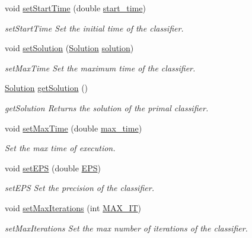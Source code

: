 \begin{DoxyCompactItemize}
void \hyperlink{class_classifier_a7f1cf3ac53b0593307a050368a912bb4}{set\+Start\+Time} (double \hyperlink{class_classifier_a4488a20bd7b4fc22d57244aaee57b002}{start\+\_\+time})
\begin{DoxyCompactList}\small\item\em set\+Start\+Time Set the initial time of the classifier. \end{DoxyCompactList}\item 
void \hyperlink{class_classifier_aef6cb633eed60712f8948a404f630e82}{set\+Solution} (\hyperlink{class_solution}{Solution} \hyperlink{class_classifier_a8e70651d36fa396f55028847acd6ae50}{solution})
\begin{DoxyCompactList}\small\item\em set\+Max\+Time Set the maximum time of the classifier. \end{DoxyCompactList}\item 
\hyperlink{class_solution}{Solution} \hyperlink{class_classifier_afd2b54ada10af9f4be1c4d326b180dc7}{get\+Solution} ()
\begin{DoxyCompactList}\small\item\em get\+Solution Returns the solution of the primal classifier. \end{DoxyCompactList}\item 
void \hyperlink{class_classifier_a5da324a0de94b7171484f3b1f1f22fbd}{set\+Max\+Time} (double \hyperlink{class_classifier_ae5ada7ce4d5436d1dcff3dff458107fd}{max\+\_\+time})
\begin{DoxyCompactList}\small\item\em Set the max time of execution. \end{DoxyCompactList}\item 
void \hyperlink{class_classifier_a9cc5a1d92243f9d9b530347be1ac7367}{set\+E\+PS} (double \hyperlink{class_classifier_ad7cd0cfea68461340df2adb0c132dc93}{E\+PS})
\begin{DoxyCompactList}\small\item\em set\+E\+PS Set the precision of the classifier. \end{DoxyCompactList}\item 
void \hyperlink{class_classifier_a58540f77a22c0f1774d0089fac713498}{set\+Max\+Iterations} (int \hyperlink{class_classifier_a9cab88ab4489d771256bffb1717c1644}{M\+A\+X\+\_\+\+IT})
\begin{DoxyCompactList}\small\item\em set\+Max\+Iterations Set the max number of iterations of the classifier. \end{DoxyCompactList}\item 

\end{DoxyCompactItemize}
